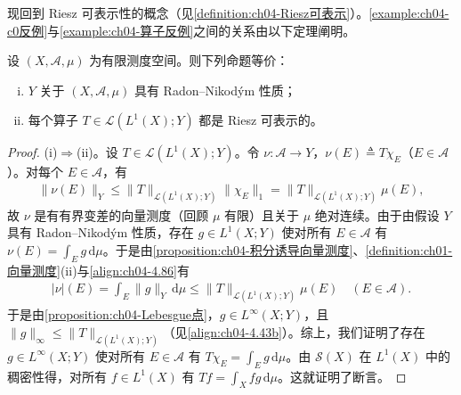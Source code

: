 \documentclass[../../main.tex]{subfiles}%
\begin{document}
现回到 Riesz 可表示性的概念（见\cref{definition:ch04-Riesz可表示}）。\cref{example:ch04-c0反例}与\cref{example:ch04-算子反例}之间的关系由以下定理阐明。

\begin{theorem}\label{theorem:ch04-RNP与可表示}
设 $(X,\mathcal{A},\mu)$ 为有限测度空间。则下列命题等价：
\begin{enumerate}[(i)]
\item\label{item:ch04-RNP与可表示-i} $Y$ 关于 $(X,\mathcal{A},\mu)$ 具有 Radon--Nikodým 性质；
\item\label{item:ch04-RNP与可表示-ii} 每个算子 $T\in\mathcal{L}(L^1(X);Y)$ 都是 Riesz 可表示的。
\end{enumerate}
\end{theorem}

\begin{proof}
(i)$\Rightarrow$(ii)。设 $T\in\mathcal{L}(L^1(X);Y)$。令 $\nu:\mathcal{A}\to Y$，$\nu(E)\triangleq T\chi_E$（$E\in\mathcal{A}$）。对每个 $E\in\mathcal{A}$，有
\begin{align}
\|\nu(E)\|_Y\leqslant\|T\|_{\mathcal{L}(L^1(X);Y)}\|\chi_E\|_1=\|T\|_{\mathcal{L}(L^1(X);Y)}\mu(E), \label{align:ch04-4.86}
\end{align}
故 $\nu$ 是有有界变差的向量测度（回顾 $\mu$ 有限）且关于 $\mu$ 绝对连续。由于由假设 $Y$ 具有 Radon--Nikodým 性质，存在 $g\in L^1(X;Y)$ 使对所有 $E\in\mathcal{A}$ 有 $\nu(E)=\int_E g\,\mathrm{d}\mu$。于是由\cref{proposition:ch04-积分诱导向量测度}、\cref{definition:ch01-向量测度}(ii)与\eqref{align:ch04-4.86}有
\begin{align*}
|\nu|(E)=\int_E\|g\|_Y\,\mathrm{d}\mu\leqslant\|T\|_{\mathcal{L}(L^1(X);Y)}\mu(E)\quad(E\in\mathcal{A}).
\end{align*}
于是由\cref{proposition:ch04-Lebesgue点}，$g\in L^\infty(X;Y)$，且 $\|g\|_\infty\leqslant\|T\|_{\mathcal{L}(L^1(X);Y)}$（见\eqref{align:ch04-4.43b}）。综上，我们证明了存在 $g\in L^\infty(X;Y)$ 使对所有 $E\in\mathcal{A}$ 有 $T\chi_E=\int_E g\,\mathrm{d}\mu$。由 $\mathcal{S}(X)$ 在 $L^1(X)$ 中的稠密性得，对所有 $f\in L^1(X)$ 有 $Tf=\int_X fg\,\mathrm{d}\mu$。这就证明了断言。


\end{proof}
\end{document}
